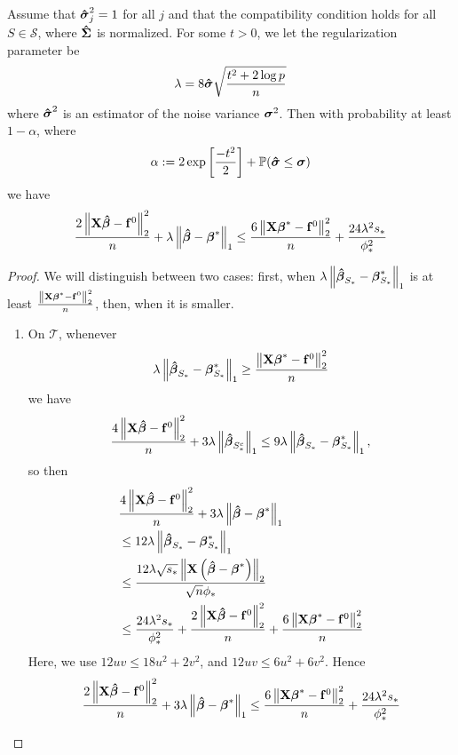 \begin{theorem}
    Assume that \(\boldsymbol{\hat{\sigma}}_{j}^{2}=1\) for all \(j\) and that the compatibility condition holds for all \(S \in \mathscr{S}\), where \(\boldsymbol{\hat{\Sigma}}\) is normalized. For some \(t>0\), we let the regularization parameter be
    \[
        \lambda=8 \boldsymbol{\hat{\sigma}} \sqrt{\frac{t^{2} + 2 \log p}{n}}
    \]
    where \(\boldsymbol{\hat{\sigma}}^{2}\) is an estimator of the noise variance \(\boldsymbol{\sigma}^{2}\). Then with probability at least \(1-\alpha\), where
    \[
        \alpha := 2 \exp \left[ \frac{-t^{2}}{2} \right] + \mathbb{P}(\boldsymbol{\hat{\sigma}} \leq \boldsymbol{\sigma})
    \]
    we have
    \[
        \frac{2\left\|\mathbf{X} \boldsymbol{\hat{\beta}}-\mathbf{f}^{0}\right\|_{2}^{2}}{n} +  \lambda\left\|\boldsymbol{\hat{\beta}}-\boldsymbol{\beta}^{*}\right\|_{1} \leq \frac{6 \left\|\mathbf{X} \boldsymbol{\beta}^{*} - \mathbf{f}^{0}\right\|_{2}^{2}}{n} + \frac{24 \lambda^{2} s_{*}}{\phi_{*}^{2}}
    \]
\end{theorem}
\begin{proof}
    We will distinguish between two cases: first, when \(\lambda\left\|\boldsymbol{\hat{\beta}}_{S_{*}}-\boldsymbol{\beta}_{S_{*}}^{*}\right\|_{1}\) is at least \(\frac{\left\|\mathbf{X} \boldsymbol{\beta}^{*}-\mathbf{f}^{0}\right\|_{2}^{2}}{n}\), then, when it is smaller.
    \begin{enumerate}
        \item On $\mathscr{T}$, whenever
              \[
                  \lambda\left\|\boldsymbol{\hat{\beta}}_{S_{*}}-\boldsymbol{\beta}_{S_{*}}^{*}\right\|_{1} \geq \frac{\left\|\mathbf{X} \boldsymbol{\beta}^{*}-\mathbf{f}^{0}\right\|_{2}^{2}}{n}
              \]
              we have
              \[
                \frac{4\left\|\mathbf{X} \boldsymbol{\hat{\beta}}-\mathbf{f}^{0}\right\|_{2}^{2}}{n}+3 \lambda\left\|\boldsymbol{\hat{\beta}}_{S_{*}^{c}}\right\|_{1} \leq 9 \lambda\left\|\boldsymbol{\hat{\beta}}_{S_{*}}-\boldsymbol{\beta}_{S_{*}}^{*}\right\|_{1},
              \]
              so then
              \begin{align*}
                  & \frac{4\left\|\mathbf{X} \boldsymbol{\hat{\beta}}-\mathbf{f}^{0}\right\|_{2}^{2}}{n} + 3 \lambda\left\|\boldsymbol{\hat{\beta}} - \boldsymbol{\beta}^{*}\right\|_{1} \\
                  & \leq 12 \lambda\left\|\boldsymbol{\hat{\beta}}_{S_{*}}-\boldsymbol{\beta}_{S_{*}}^{*}\right\|_{1} \\
                  & \leq \frac{12 \lambda \sqrt{s_{*}}\left\|\mathbf{X}\left(\boldsymbol{\hat{\beta}}-\boldsymbol{\beta}^{*}\right)\right\|_{2}}{\sqrt{n} \phi_{*}} \\
                  & \leq \frac{24 \lambda^{2} s_{*}}{\phi_{*}^{2}} + \frac{2\left\|\mathbf{X} \boldsymbol{\hat{\beta}}-\mathbf{f}^{0}\right\|_{2}^{2}}{n} + \frac{6\left\|\mathbf{X} \boldsymbol{\beta}^{*} - \mathbf{f}^{0}\right\|_{2}^{2}}{n}
              \end{align*}
              Here, we use $12 u v \leq 18 u^{2}+2 v^{2}$, and $12 u v \leq 6 u^{2}+6 v^{2}$. Hence
              \[
                \frac{2\left\|\mathbf{X} \boldsymbol{\hat{\beta}}-\mathbf{f}^{0}\right\|_{2}^{2}}{n} + 3 \lambda\left\|\boldsymbol{\hat{\beta}}-\boldsymbol{\beta}^{*}\right\|_{1} \leq \frac{6\left\|\mathbf{X} \boldsymbol{\beta}^{*}-\mathbf{f}^{0}\right\|_{2}^{2}}{n} + \frac{24 \lambda^{2} s_{*}}{\phi_{*}^{2}}
\]
\end{enumerate}
\end{proof}
